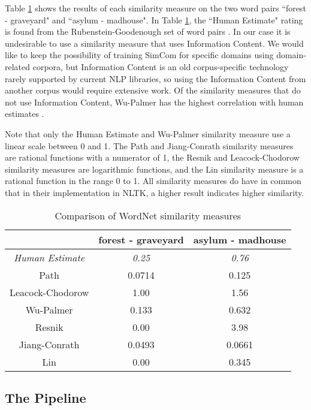 \documentclass{article}
\begin{document}
Table \ref{table:wordnetsimilarity} shows the results of each similarity measure on the two word pairs ``forest - graveyard" and ``asylum - madhouse". In Table \ref{table:wordnetsimilarity}, the ``Human Estimate" rating is found from the Rubenstein-Goodenough set of word pairs \cite{rubenstein1965contextual}. In our case it is undesirable to use a similarity measure that uses Information Content. We would like to keep the possibility of training SimCom for specific domains using domain-related corpora, but Information Content is an old corpus-specific technology rarely supported by current NLP libraries, so using the Information Content from another corpus would require extensive work. Of the similarity measures that do not use Information Content, Wu-Palmer has the highest correlation with human estimates \citep{budanitsky2006evaluating,seco2004intrinsic,mihalcea2006corpus}. %

Note that only the Human Estimate and Wu-Palmer similarity measure use a linear scale between 0 and 1. The Path and Jiang-Conrath similarity measures are rational functions with a numerator of 1, the Resnik and Leacock-Chodorow similarity measures are logarithmic functions, and the Lin similarity measure is a rational function in the range 0 to 1. All similarity measures do have in common that in their implementation in NLTK, a higher result indicates higher similarity.

\begin{table}[h!]
\caption{Comparison of WordNet similarity measures} %
\centering
\begin{tabular}{|c||c|c|}
	\hline
	& forest - graveyard & asylum - madhouse \\
	\hline
	\textit{Human Estimate} & \textit{0.25} & \textit{0.76} \\
	Path & 0.0714 & 0.125 \\
	Leacock-Chodorow & 1.00 & 1.56 \\
	Wu-Palmer & 0.133 & 0.632 \\
	Resnik & 0.00 & 3.98 \\
	Jiang-Conrath & 0.0493 & 0.0661 \\
	Lin & 0.00 & 0.345 \\
	\hline
\end{tabular}
\label{table:wordnetsimilarity}
\end{table}

\subsection{The Pipeline}
\end{document}
